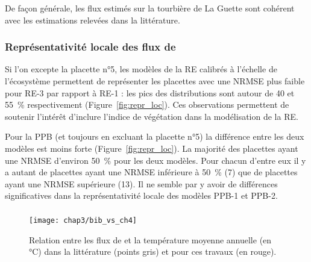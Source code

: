 
De façon générale, les flux estimés sur la tourbière de La Guette sont cohérent avec les estimations relevées dans la littérature.


\subsubsection{Représentativité locale des flux de \coo}

Si l'on excepte la placette n°5, les modèles de la RE calibrés à l'échelle de l'écosystème permettent de représenter les placettes avec une NRMSE plus faible pour RE-3 par rapport à RE-1 : les pics des distributions sont autour de 40 et \SI{55}{\percent} respectivement (Figure~\ref{fig:repr_loc}).
Ces observations permettent de soutenir l'intérêt d'inclure l'indice de végétation dans la modélisation de la RE.

Pour la PPB (et toujours en excluant la placette n°5) la différence entre les deux modèles est moins forte (Figure~\ref{fig:repr_loc}).
La majorité des placettes ayant une NRMSE d'environ \SI{50}{\percent} pour les deux modèles.
Pour chacun d'entre eux il y a autant de placettes ayant une NRMSE inférieure à \SI{50}{\percent} (7) que de placettes ayant une NRMSE supérieure (13).
Il ne semble par y avoir de différences significatives dans la représentativité locale des modèles PPB-1 et PPB-2.




\subsubsection{\fchh}

\begin{figure}
\centering
\texttt{[image: chap3/bib\_vs\_ch4]}
\caption{Relation entre les flux de \chh  et la température moyenne annuelle (en °C) dans la littérature (points gris) et pour ces travaux (en rouge).}
\label{fig:bib_vs_ch4}
\end{figure}

